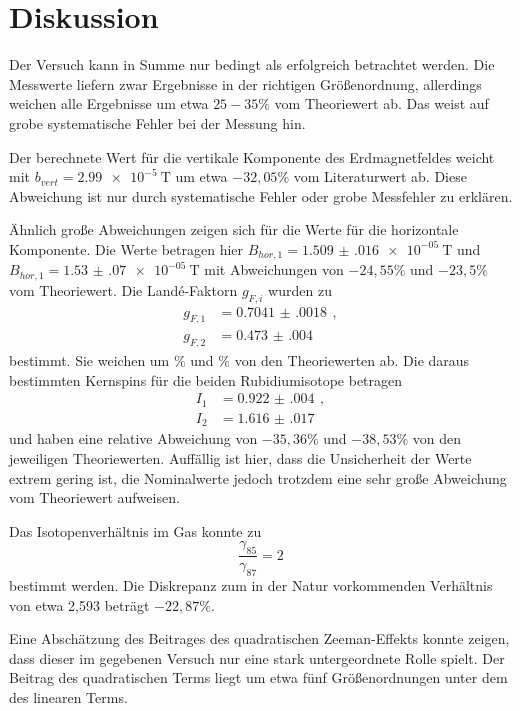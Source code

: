 \newpage
\section{Diskussion}
\label{sec:Diskussion}

Der Versuch kann in Summe nur bedingt als erfolgreich betrachtet werden. Die Messwerte
liefern zwar Ergebnisse in der richtigen Größenordnung, allerdings weichen alle Ergebnisse um
etwa $25-35\%$ vom Theoriewert ab. Das weist auf grobe systematische Fehler bei der Messung hin.

Der berechnete Wert für die vertikale Komponente des Erdmagnetfeldes weicht mit
$b_{vert}=\SI{2.99e-5}{\tesla}$ um etwa $-32{,}05\%$ vom Literaturwert ab. Diese Abweichung
ist nur durch systematische Fehler oder grobe Messfehler zu erklären.

Ähnlich große Abweichungen zeigen sich für die Werte für die horizontale Komponente.
Die Werte betragen hier $B_{hor,1}=\SI{1.509(016)e-05}{\tesla}$ und
$B_{hor,1}=\SI{1.53(07)e-05}{\tesla}$ mit Abweichungen von $-24{,}55\%$ und $-23{,}5\%$
vom Theoriewert. Die Landé-Faktorn $g_{F,i}$ wurden zu
\begin{align*}
  g_{F,1}&= \SI{0.7041(0018)}{}\,,\\
  g_{F,2}&= \SI{0.473(004)}{}
\end{align*}
bestimmt. Sie weichen um $\%$ und $\%$ von den Theoriewerten ab.
Die daraus bestimmten Kernspins für die beiden Rubidiumisotope betragen
\begin{align*}
  I_1&= \SI{0.922(004)}{}\,,\\
  I_2&= \SI{1.616(017)}{}
\end{align*}
und haben eine relative Abweichung von $-35{,}36\%$ und $-38{,}53\%$ von den jeweiligen
Theoriewerten. Auffällig ist hier, dass die Unsicherheit der Werte extrem gering ist,
die Nominalwerte jedoch trotzdem eine sehr große Abweichung vom Theoriewert aufweisen.

Das Isotopenverhältnis im Gas konnte zu
\begin{equation}
  \frac{\gamma_{85}}{\gamma_{87}}= 2
\end{equation}
bestimmt werden. Die Diskrepanz zum in der Natur vorkommenden Verhältnis von
etwa 2{,}593 beträgt $-22{,}87\%$.

Eine Abschätzung des Beitrages des quadratischen Zeeman-Effekts konnte zeigen, dass
dieser im gegebenen Versuch nur eine stark untergeordnete Rolle spielt. Der Beitrag des
quadratischen Terms liegt um etwa fünf Größenordnungen unter dem des linearen Terms.

